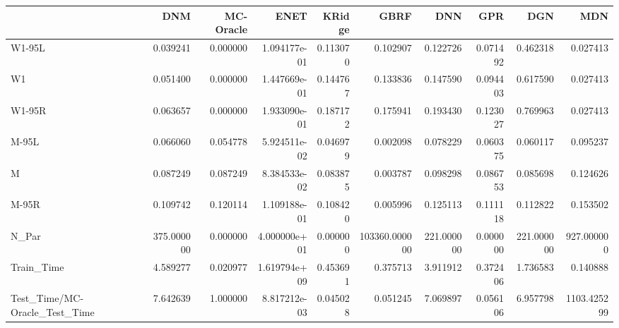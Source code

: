 \begin{tabular}{lrrrrrrrrr}
\toprule
{} &         DNM &  MC-Oracle &          ENET &    KRidge &           GBRF &         DNN &       GPR &         DGN &          MDN \\
\midrule
W1-95L                        &    0.039241 &   0.000000 &  1.094177e-01 &  0.113070 &       0.102907 &    0.122726 &  0.071492 &    0.462318 &     0.027413 \\
W1                            &    0.051400 &   0.000000 &  1.447669e-01 &  0.144767 &       0.133836 &    0.147590 &  0.094403 &    0.617590 &     0.027413 \\
W1-95R                        &    0.063657 &   0.000000 &  1.933090e-01 &  0.187172 &       0.175941 &    0.193430 &  0.123027 &    0.769963 &     0.027413 \\
M-95L                         &    0.066060 &   0.054778 &  5.924511e-02 &  0.046979 &       0.002098 &    0.078229 &  0.060375 &    0.060117 &     0.095237 \\
M                             &    0.087249 &   0.087249 &  8.384533e-02 &  0.083875 &       0.003787 &    0.098298 &  0.086753 &    0.085698 &     0.124626 \\
M-95R                         &    0.109742 &   0.120114 &  1.109188e-01 &  0.108420 &       0.005996 &    0.125113 &  0.111118 &    0.112822 &     0.153502 \\
N\_Par                         &  375.000000 &   0.000000 &  4.000000e+01 &  0.000000 &  103360.000000 &  221.000000 &  0.000000 &  221.000000 &   927.000000 \\
Train\_Time                    &    4.589277 &   0.020977 &  1.619794e+09 &  0.453691 &       0.375713 &    3.911912 &  0.372406 &    1.736583 &     0.140888 \\
Test\_Time/MC-Oracle\_Test\_Time &    7.642639 &   1.000000 &  8.817212e-03 &  0.045028 &       0.051245 &    7.069897 &  0.056106 &    6.957798 &  1103.425299 \\
\bottomrule
\end{tabular}
